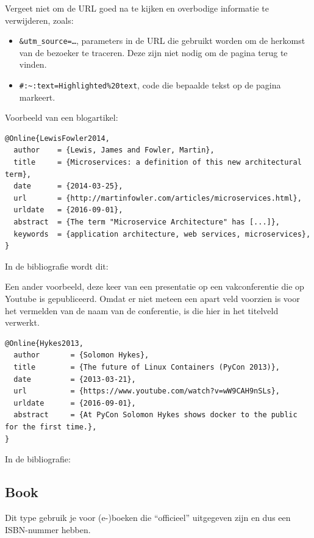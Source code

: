 Vergeet niet om de URL goed na te kijken en overbodige informatie te verwijderen, zoals:

\begin{itemize}
  \item \texttt{\&utm\_source=\ldots}, parameters in de URL die gebruikt worden om de herkomst van de bezoeker te traceren. Deze zijn niet nodig om de pagina terug te vinden.
  \item \texttt{\#:\textasciitilde:text=Highlighted\%20text}, code die bepaalde tekst op de pagina markeert.
\end{itemize}

Voorbeeld van een blogartikel:

\begin{verbatim}
@Online{LewisFowler2014,
  author    = {Lewis, James and Fowler, Martin},
  title     = {Microservices: a definition of this new architectural term},
  date      = {2014-03-25},
  url       = {http://martinfowler.com/articles/microservices.html},
  urldate   = {2016-09-01},
  abstract  = {The term "Microservice Architecture" has [...]},
  keywords  = {application architecture, web services, microservices},
}
\end{verbatim}

In de bibliografie wordt dit: 

Een ander voorbeeld, deze keer van een presentatie op een vakconferentie die op Youtube is gepubliceerd. Omdat er niet meteen een apart veld voorzien is voor het vermelden van de naam van de conferentie, is die hier in het titelveld verwerkt.

\begin{verbatim}
@Online{Hykes2013,
  author       = {Solomon Hykes},
  title        = {The future of Linux Containers (PyCon 2013)},
  date         = {2013-03-21},
  url          = {https://www.youtube.com/watch?v=wW9CAH9nSLs},
  urldate      = {2016-09-01},
  abstract     = {At PyCon Solomon Hykes shows docker to the public for the first time.},
}
\end{verbatim}

In de bibliografie: 

\subsection{Book}%
\label{ssec:book}

Dit type gebruik je voor (e-)boeken die ``officieel'' uitgegeven zijn en dus een ISBN-nummer hebben.

